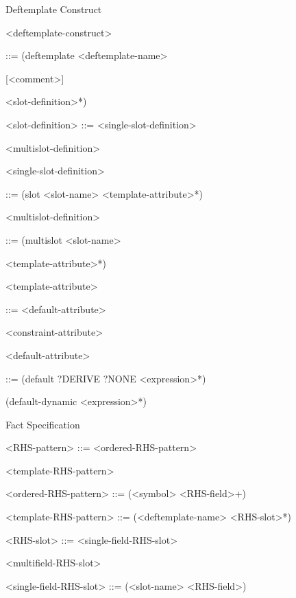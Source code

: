 \documentclass[letterpaper,10pt,english]{sphinxmanual}
\begin{document}
Deftemplate Construct

\textless{}deftemplate-construct\textgreater{}

::= (deftemplate \textless{}deftemplate-name\textgreater{}

{[}\textless{}comment\textgreater{}{]}

\textless{}slot-definition\textgreater{}*)

\textless{}slot-definition\textgreater{} ::= \textless{}single-slot-definition\textgreater{} \textbar{}

\textless{}multislot-definition\textgreater{}

\textless{}single-slot-definition\textgreater{}

::= (slot \textless{}slot-name\textgreater{} \textless{}template-attribute\textgreater{}*)

\textless{}multislot-definition\textgreater{}

::= (multislot \textless{}slot-name\textgreater{}

\textless{}template-attribute\textgreater{}*)

\textless{}template-attribute\textgreater{}

::= \textless{}default-attribute\textgreater{} \textbar{}

\textless{}constraint-attribute\textgreater{}

\textless{}default-attribute\textgreater{}

::= (default ?DERIVE \textbar{} ?NONE \textbar{} \textless{}expression\textgreater{}*) \textbar{}

(default-dynamic \textless{}expression\textgreater{}*)

Fact Specification

\textless{}RHS-pattern\textgreater{} ::= \textless{}ordered-RHS-pattern\textgreater{} \textbar{}

\textless{}template-RHS-pattern\textgreater{}

\textless{}ordered-RHS-pattern\textgreater{} ::= (\textless{}symbol\textgreater{} \textless{}RHS-field\textgreater{}+)

\textless{}template-RHS-pattern\textgreater{} ::= (\textless{}deftemplate-name\textgreater{} \textless{}RHS-slot\textgreater{}*)

\textless{}RHS-slot\textgreater{} ::= \textless{}single-field-RHS-slot\textgreater{} \textbar{}

\textless{}multifield-RHS-slot\textgreater{}

\textless{}single-field-RHS-slot\textgreater{} ::= (\textless{}slot-name\textgreater{} \textless{}RHS-field\textgreater{})
\end{document}
